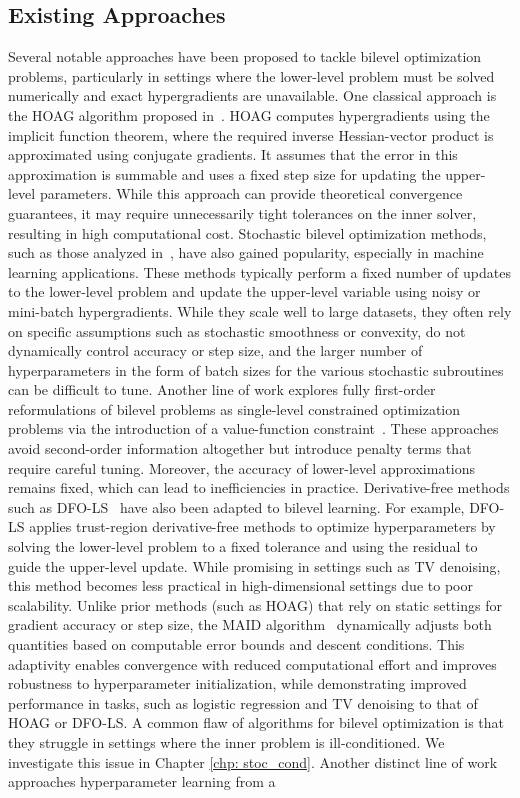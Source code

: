 \documentclass[11pt, twoside]{report}
\begin{document}
\subsection{Existing Approaches}
Several notable approaches have been proposed to tackle bilevel optimization problems, particularly in settings where the lower-level problem must be solved numerically and exact hypergradients are unavailable. One classical approach is the HOAG algorithm proposed in~\cite{pedregosa2016hyperparameter}. HOAG computes hypergradients using the implicit function theorem, where the required inverse Hessian-vector product is approximated using conjugate gradients. It assumes that the error in this approximation is summable and uses a fixed step size for updating the upper-level parameters. While this approach can provide theoretical convergence guarantees, it may require unnecessarily tight tolerances on the inner solver, resulting in high computational cost. Stochastic bilevel optimization methods, such as those analyzed in~\cite{ghadimi2018approximation, hong2020twotimescale, ji2021bilevel}, have also gained popularity, especially in machine learning applications. These methods typically perform a fixed number of updates to the lower-level problem and update the upper-level variable using noisy or mini-batch hypergradients. While they scale well to large datasets, they often rely on specific assumptions such as stochastic smoothness or convexity, do not dynamically control accuracy or step size, and the larger number of hyperparameters in the form of batch sizes for the various stochastic subroutines can be difficult to tune. Another line of work explores fully first-order reformulations of bilevel problems as single-level constrained optimization problems via the introduction of a value-function constraint~\cite{ye2022bome}. These approaches avoid second-order information altogether but introduce penalty terms that require careful tuning. Moreover, the accuracy of lower-level approximations remains fixed, which can lead to inefficiencies in practice. Derivative-free methods such as DFO-LS~\cite{ehrhardt2021inexact} have also been adapted to bilevel learning. For example, DFO-LS applies trust-region derivative-free methods to optimize hyperparameters by solving the lower-level problem to a fixed tolerance and using the residual to guide the upper-level update. While promising in settings such as TV denoising, this method becomes less practical in high-dimensional settings due to poor scalability. Unlike prior methods (such as HOAG) that rely on static settings for gradient accuracy or step size, the MAID algorithm~\cite{salehi2024adaptively} dynamically adjusts both quantities based on computable error bounds and descent conditions. This adaptivity enables convergence with reduced computational effort and improves robustness to hyperparameter initialization, while demonstrating improved performance in tasks, such as logistic regression and TV denoising to that of HOAG or DFO-LS. A common flaw of algorithms for bilevel optimization is that they struggle in settings where the inner problem is ill-conditioned. We investigate this issue in Chapter \ref{chp: stoc_cond}. Another distinct line of work approaches hyperparameter learning from a 
\end{document}
